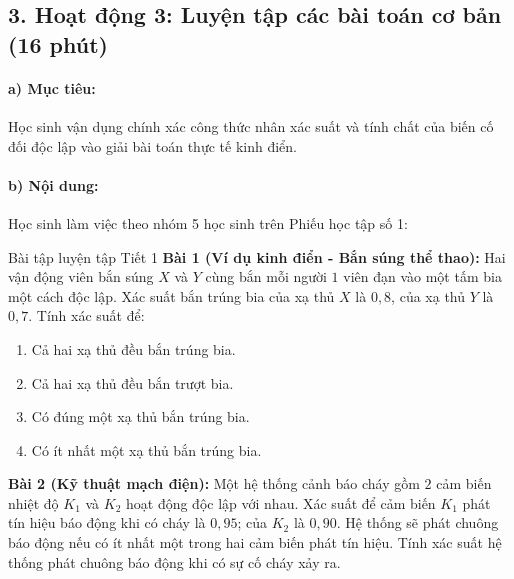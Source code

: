 \documentclass[12pt, a4paper]{article}
\begin{document}
\subsection*{3. Hoạt động 3: Luyện tập các bài toán cơ bản (16 phút)}

\paragraph{a) Mục tiêu:} Học sinh vận dụng chính xác công thức nhân xác suất và tính chất của biến cố đối độc lập vào giải bài toán thực tế kinh điển.

\paragraph{b) Nội dung:} Học sinh làm việc theo nhóm 5 học sinh trên Phiếu học tập số 1:

\begin{pedabox}{Bài tập luyện tập Tiết 1}
\textbf{Bài 1 (Ví dụ kinh điển - Bắn súng thể thao):} Hai vận động viên bắn súng $X$ và $Y$ cùng bắn mỗi người $1$ viên đạn vào một tấm bia một cách độc lập. Xác suất bắn trúng bia của xạ thủ $X$ là $0{,}8$, của xạ thủ $Y$ là $0{,}7$. Tính xác suất để:
\begin{enumerate}[leftmargin=0.6cm]
    \item[a)] Cả hai xạ thủ đều bắn trúng bia.
    \item[b)] Cả hai xạ thủ đều bắn trượt bia.
    \item[c)] Có đúng một xạ thủ bắn trúng bia.
    \item[d)] Có ít nhất một xạ thủ bắn trúng bia.
\end{enumerate}

\textbf{Bài 2 (Kỹ thuật mạch điện):} Một hệ thống cảnh báo cháy gồm $2$ cảm biến nhiệt độ $K_1$ và $K_2$ hoạt động độc lập với nhau. Xác suất để cảm biến $K_1$ phát tín hiệu báo động khi có cháy là $0{,}95$; của $K_2$ là $0{,}90$. Hệ thống sẽ phát chuông báo động nếu có ít nhất một trong hai cảm biến phát tín hiệu. Tính xác suất hệ thống phát chuông báo động khi có sự cố cháy xảy ra.
\end{pedabox}
\end{document}
